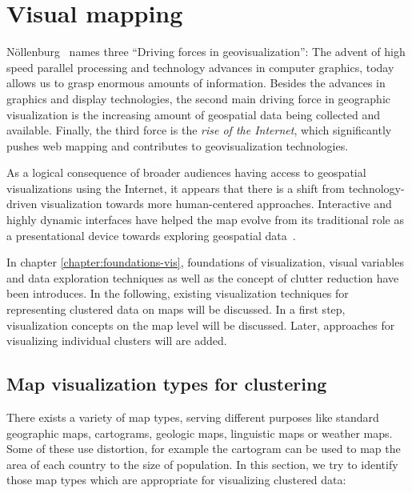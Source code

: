 
%
%

\section{Visual mapping}

N\"{o}llenburg~\cite{noellenburg11geovis} names three ``Driving forces in geovisualization'': The advent of high speed parallel processing and technology advances in computer graphics, today allows us to grasp enormous amounts of information. Besides the advances in graphics and display technologies, the second main driving force in geographic visualization is the increasing amount of geospatial data being collected and available. Finally, the third force is the \textit{rise of the Internet}, which significantly pushes web mapping and contributes to geovisualization technologies.

As a logical consequence of broader audiences having access to geospatial visualizations using the Internet, it appears that there is a shift from technology-driven visualization towards more human-centered approaches. Interactive and highly dynamic interfaces have helped the map evolve from its traditional role as a presentational device towards exploring geospatial data~\cite{noellenburg11geovis, vislecture}.

In chapter \ref{chapter:foundations-vis}, foundations of visualization, visual variables and data exploration techniques as well as the concept of clutter reduction have been introduces. In the following, existing visualization techniques for representing clustered data on maps will be discussed. In a first step, visualization concepts on the map level will be discussed. Later, approaches for visualizing individual clusters will are added. 

\subsection{Map visualization types for clustering}
\label{chapter:map-vis}

There exists a variety of map types, serving different purposes like standard geographic maps, cartograms, geologic maps, linguistic maps or weather maps. Some of these use distortion, for example the cartogram can be used to map the area of each country to the size of population. In this section, we try to identify those map types which are appropriate for visualizing clustered data\cite{noellenburg11geovis, wiki:map-types}:

